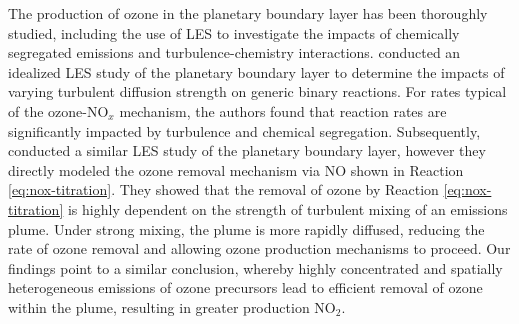 
The production of ozone in the planetary boundary layer has been thoroughly studied, including the use of LES to investigate the impacts of chemically segregated emissions and turbulence-chemistry interactions. \textcite{schumann_large-eddy_1989} conducted an idealized LES study of the planetary boundary layer to determine the impacts of varying turbulent diffusion strength on generic binary reactions. For rates typical of the ozone-NO$_x$ mechanism, the authors found that reaction rates are significantly impacted by turbulence and chemical segregation. Subsequently, \textcite{sykes_large-eddy_1992} conducted a similar LES study of the planetary boundary layer, however they directly modeled the ozone removal mechanism via NO shown in Reaction \ref{eq:nox-titration}. They showed that the removal of ozone by Reaction \ref{eq:nox-titration} is highly dependent on the strength of turbulent mixing of an emissions plume. Under strong mixing, the plume is more rapidly diffused, reducing the rate of ozone removal and allowing ozone production mechanisms to proceed. Our findings point to a similar conclusion, whereby highly concentrated and spatially heterogeneous emissions of ozone precursors lead to efficient removal of ozone within the plume, resulting in greater production NO$_2$. 

